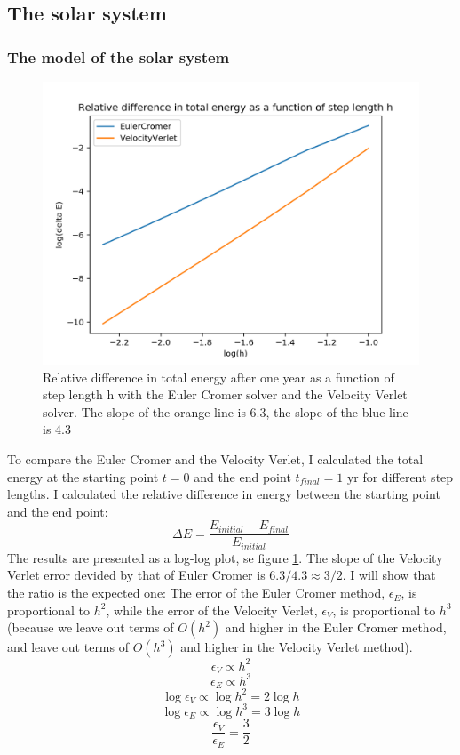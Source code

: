 \documentclass{article}
\begin{document}
\subsection{The solar system}
\subsubsection{The model of the solar system}
\begin{figure}
  \includegraphics[width=\linewidth]{energy_loss.png}
  \caption{Relative difference in total energy after one year as a function of step length h with the Euler Cromer solver and the Velocity Verlet solver. The slope of the orange line is 6.3, the slope of the blue line is 4.3}
  \label{fig:energy_loss}
\end{figure}
To compare the Euler Cromer and the Velocity Verlet, I calculated the total energy at the starting point $t=0$ and the end point $t_{final} =1 \textrm{ yr}$ for different step lengths. I calculated the relative difference in energy between the starting point and the end point:
$$\Delta E = \frac{E_{initial}-E_{final}}{E_{initial}}$$
The results are presented as a log-log plot, se figure \ref{fig:energy_loss}. The slope of the Velocity Verlet error devided by that of Euler Cromer is $6.3/4.3 \approx 3/2$. I will show that the ratio is the expected one: The error of the Euler Cromer method, $\epsilon_E$, is proportional to $h^2$, while the error of the Velocity Verlet, $\epsilon_V$, is proportional to $h^3$ (because we leave out terms of $O(h^2)$ and higher in the Euler Cromer method, and leave out terms of $O(h^3)$ and higher in the Velocity Verlet method). 
$$\epsilon_V \propto h^2$$
$$\epsilon_E \propto h^3$$
$$\log \epsilon_V  \propto \log h^2 = 2\log h$$
$$\log \epsilon_E  \propto \log h^3 = 3\log h$$
$$\frac{\epsilon_V}{\epsilon_E} = \frac{3}{2}$$
\end{document}
